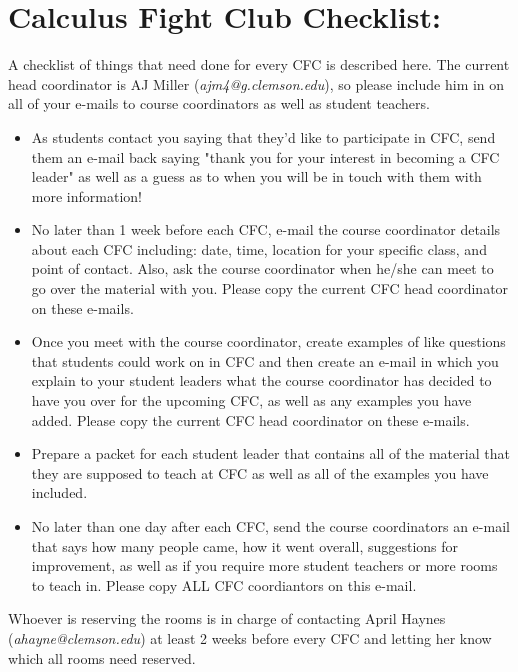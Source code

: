 \documentclass[paper=a4, fontsize=11pt]{scrartcl} %
\numberwithin{equation}{section} %
\numberwithin{figure}{section} %
\numberwithin{table}{section} %
\begin{document}
\section*{\textbf{Calculus Fight Club Checklist:}}
A checklist of things that need done for every CFC is described here.  The current head coordinator is AJ Miller (\textit{ajm4@g.clemson.edu}), so please include him in on all of your e-mails to course coordinators as well as student teachers.
\begin{itemize}
\item As students contact you saying that they'd like to participate in CFC, send them an e-mail back saying "thank you for your interest in becoming a CFC leader" as well as a guess as to when you will be in touch with them with more information!
\item No later than 1 week before each CFC, e-mail the course coordinator details about each CFC including: date, time, location for your specific class, and point of contact.  Also, ask the course coordinator when he/she can meet to go over the material with you.  Please copy the current CFC head coordinator on these e-mails.
\item Once you meet with the course coordinator, create examples of like questions that students could work on in CFC and then create an e-mail in which you explain to your student leaders what the course coordinator has decided to have you over for the upcoming CFC, as well as any examples you have added.  Please copy the current CFC head coordinator on these e-mails.
\item Prepare a packet for each student leader that contains all of the material that they are supposed to teach at CFC as well as all of the examples you have included.
\item No later than one day after each CFC, send the course coordinators an e-mail that says how many people came, how it went overall, suggestions for improvement, as well as if you require more student teachers or more rooms to teach in.  Please copy ALL CFC coordiantors on this e-mail.
\end{itemize}

Whoever is reserving the rooms is in charge of contacting April Haynes (\textit{ahayne@clemson.edu}) at least 2 weeks before every CFC and letting her know which all rooms need reserved.
\end{document}
